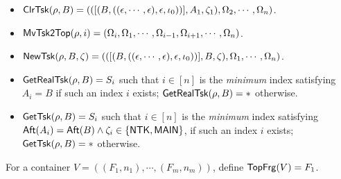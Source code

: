 \begin{itemize}
    \item $\mathsf{ClrTsk}(\rho, B)  = (([(B,((\epsilon,\cdots,\epsilon),\epsilon,\iota_0))],A_1,\zeta_1),\Omega_2,\cdots, \Omega_n)$.
	
    \item $\mathsf{MvTsk2Top}(\rho, i) = (\Omega_i,\Omega_1,\cdots,\Omega_{i-1},\Omega_{i+1},\cdots,\Omega_n)$.

    \item $\mathsf{NewTsk}(\rho, B, \zeta)  = (([(B,((\epsilon,\cdots,\epsilon),\epsilon,\iota_0))],B,\zeta),\Omega_1,\cdots, \Omega_n)$.
	
	\item $\mathsf{GetRealTsk}(\rho, B) = S_i$ such that $i \in [n]$ is the \emph{minimum} index satisfying $A_i = B$ if such an index $i$ exists; $\mathsf{GetRealTsk}(\rho, B) = *$ otherwise.
	
    \item $\mathsf{GetTsk}(\rho, B) = S_i$ such that $i \in [n]$ is the \emph{minimum} index satisfying ${\sf Aft}(A_i)={\sf Aft}(B)\wedge\zeta_i\in\{{\sf NTK},{\sf MAIN}\}$, if such an index $i$ exists; $\mathsf{GetTsk}(\rho, B) = *$ otherwise.
	
\end{itemize}
\smallskip


For a container $V=((F_1, n_1), \cdots, (F_{m}, n_m))$, define ${\sf TopFrg}(V) = F_1$.

